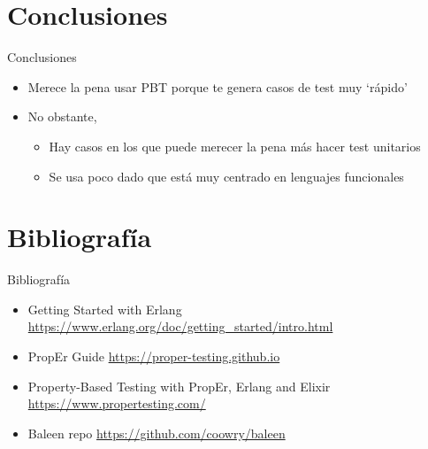 \documentclass{beamer}
\begin{document}
  \section{Conclusiones}
    \begin{frame}{Conclusiones}
      \begin{itemize}
        \item Merece la pena usar PBT porque te genera casos de test muy `rápido'
        \item No obstante,
        \begin{itemize}
          \item Hay casos en los que puede merecer la pena más hacer test unitarios
          \item Se usa poco dado que está muy centrado en lenguajes funcionales
        \end{itemize}
      \end{itemize}
    \end{frame}

  \section{Bibliografía}
    \begin{frame}{Bibliografía}
      \begin{itemize}
        \item Getting Started with Erlang \url{https://www.erlang.org/doc/getting_started/intro.html}
        \item PropEr Guide \url{https://proper-testing.github.io}
        \item Property-Based Testing with PropEr, Erlang and Elixir \url{https://www.propertesting.com/}
        \item Baleen repo \url{https://github.com/coowry/baleen}
      \end{itemize}
    \end{frame}
\end{document}
